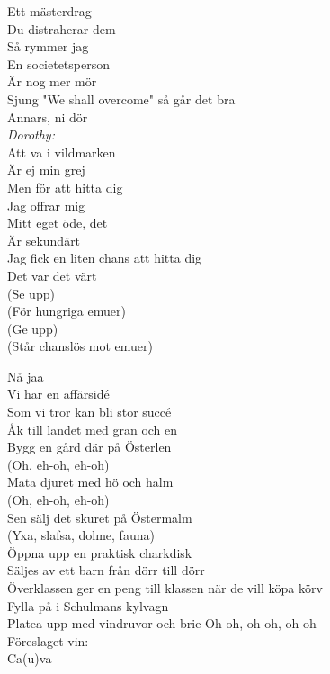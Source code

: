 \documentclass[a6paper, 10pt, twoside]{article}
\begin{document}
\begin{lyrics}
Ett mästerdrag\\
Du distraherar dem\\
Så rymmer jag\\
En societetsperson\\
Är nog mer mör\\
Sjung "We shall overcome" så går det bra\\
Annars, ni dör
\vspace{5pt}\\
\textit{Dorothy:}\\
Att va i vildmarken\\
Är ej min grej\\
Men för att hitta dig\\
Jag offrar mig\\
Mitt eget öde, det\\
Är sekundärt\\
Jag fick en liten chans att hitta dig\\
Det var det värt
\vspace{5pt}\\
(Se upp)\\
(För hungriga emuer)\\
(Ge upp)\\
(Står chanslös mot emuer)
\end{lyrics}

\begin{center}
\end{center}
\begin{lyrics}
Nå jaa
\vspace{5pt}\\
Vi har en affärsidé\\
Som vi tror kan bli stor succé\\
Åk till landet med gran och en\\
Bygg en gård där på Österlen
\vspace{5pt}\\
(Oh, eh-oh, eh-oh)\\
Mata djuret med hö och halm\\
(Oh, eh-oh, eh-oh)\\
Sen sälj det skuret på Östermalm\\
(Yxa, slafsa, dolme, fauna)
\vspace{5pt}\\
Öppna upp en praktisk charkdisk\\
Säljes av ett barn från dörr till dörr\\
Överklassen ger en peng till klassen när de vill köpa körv\\
Fylla på i Schulmans kylvagn\\
Platea upp med vindruvor och brie
Oh-oh, oh-oh, oh-oh\\
Föreslaget vin:\\
Ca(u)va
\end{lyrics}
\end{document}
